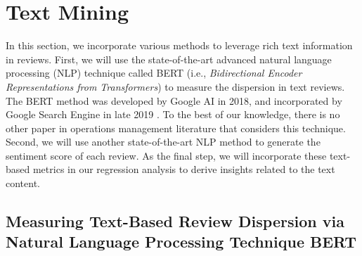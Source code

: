 \documentclass[msom,blindrev]{informs3}
\begin{document}
	
\section{Text Mining}\label{Sec: TextMining}

	
	In this section, we incorporate various methods to leverage rich text information in reviews.  First, we will use the state-of-the-art advanced natural language processing (NLP) technique called BERT (i.e., \textit{Bidirectional Encoder Representations from Transformers}) to measure the dispersion in text reviews. The BERT method was developed by Google AI in 2018, and incorporated by  Google Search Engine in late 2019 \citep{devlin2018bert,BERT}. To the best of our knowledge, there is no other paper in operations management literature that considers this technique. Second, we will use another state-of-the-art NLP method to generate the sentiment score of each review. As the final step, we will incorporate these text-based metrics in our regression analysis to derive insights related to the text content.
	
\subsection{Measuring Text-Based Review Dispersion via Natural Language Processing Technique BERT} \label{Subsec: Define Txt Ent}
	
\end{document}

